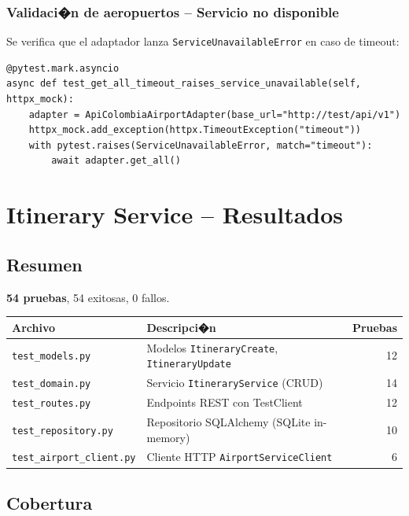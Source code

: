 \documentclass[12pt,a4paper]{article}
\begin{document}
\subsubsection{Validaci�n de aeropuertos -- Servicio no disponible}
Se verifica que el adaptador lanza \texttt{ServiceUnavailableError} en caso de timeout:

\vspace{0.3cm}
\begin{lstlisting}[style=pythonstyle]
@pytest.mark.asyncio
async def test_get_all_timeout_raises_service_unavailable(self, httpx_mock):
    adapter = ApiColombiaAirportAdapter(base_url="http://test/api/v1")
    httpx_mock.add_exception(httpx.TimeoutException("timeout"))
    with pytest.raises(ServiceUnavailableError, match="timeout"):
        await adapter.get_all()
\end{lstlisting}

\section{Itinerary Service -- Resultados}

\subsection{Resumen}

\textbf{54 pruebas}, 54 exitosas, 0 fallos.

\vspace{0.3cm}
\begin{tabularx}{\textwidth}{lXr}
  \toprule
  \textbf{Archivo} & \textbf{Descripci�n} & \textbf{Pruebas} \\
  \midrule
  \texttt{test\_models.py} & Modelos \texttt{ItineraryCreate}, \texttt{ItineraryUpdate} & 12 \\
  \texttt{test\_domain.py} & Servicio \texttt{ItineraryService} (CRUD) & 14 \\
  \texttt{test\_routes.py} & Endpoints REST con TestClient & 12 \\
  \texttt{test\_repository.py} & Repositorio SQLAlchemy (SQLite in-memory) & 10 \\
  \texttt{test\_airport\_client.py} & Cliente HTTP \texttt{AirportServiceClient} & 6 \\
  \bottomrule
\end{tabularx}

\subsection{Cobertura}
\end{document}
